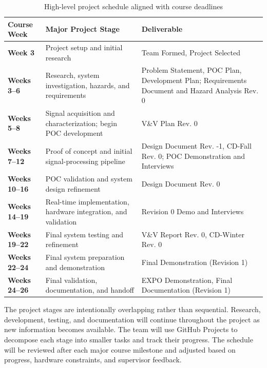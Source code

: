 \documentclass{article}
\begin{document}
\begin{table}[H]
\centering
\small
\begin{tabularx}{\textwidth}{p{} X X}
\toprule
\textbf{Course Week} & \textbf{Major Project Stage} & \textbf{Deliverable} \\
\midrule

\textbf{Week 3} &
Project setup and initial research &
Team Formed, Project Selected \\

\textbf{Weeks 3--6} &
Research, system investigation, hazards, and requirements &
Problem Statement, POC Plan, Development Plan; Requirements Document and Hazard Analysis Rev. 0 \\

\textbf{Weeks 5--8} &
Signal acquisition and characterization; begin POC development &
V\&V Plan Rev. 0 \\

\textbf{Weeks 7--12} &
Proof of concept and initial signal-processing pipeline &
Design Document Rev. -1, CD-Fall Rev. 0; POC Demonstration and Interviews \\

\textbf{Weeks 10--16} &
POC validation and system design refinement &
Design Document Rev. 0  \\

\textbf{Weeks 14--19} &
Real-time implementation, hardware integration, and validation &
Revision 0 Demo and Interviews \\

\textbf{Weeks 19--22} &
Final system testing and refinement &
V\&V Report Rev. 0, CD-Winter Rev. 0 \\

\textbf{Weeks 22--24} &
Final system preparation and demonstration &
Final Demonstration (Revision 1) \\

\textbf{Weeks 24--26} &
Final validation, documentation, and handoff &
EXPO Demonstration, Final Documentation (Revision 1) \\

\bottomrule
\end{tabularx}
\caption{High-level project schedule aligned with course deadlines}
\label{TblProjectSchedule}
\end{table}

The project stages are intentionally overlapping rather than sequential. Research, development, testing, and documentation will continue throughout the project as new information becomes available. The team will use GitHub Projects to decompose each stage into smaller tasks and track their progress. The schedule will be reviewed after each major course milestone and adjusted based on progress, hardware constraints, and supervisor feedback.
\end{document}

